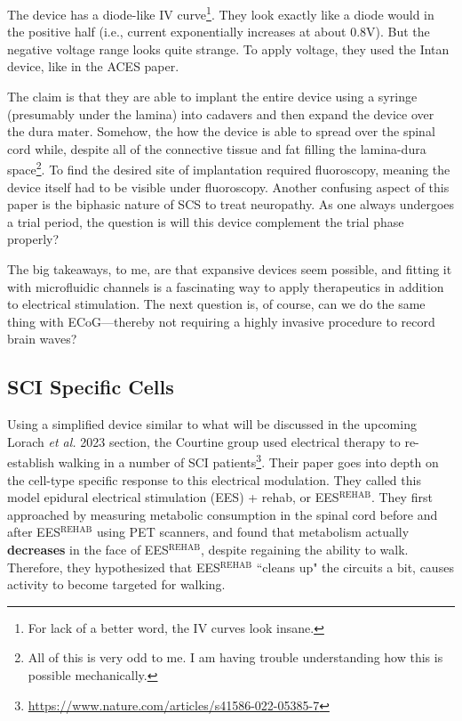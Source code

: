 The device has a diode-like IV curve\footnote{For lack of a better word, the IV curves look insane.}. They look exactly like a diode would in the positive half (i.e., current exponentially increases at about 0.8V). But the negative voltage range looks quite strange. To apply voltage, they used the Intan device, like in the ACES paper.\newline

The claim is that they are able to implant the entire device using a syringe (presumably under the lamina) into cadavers and then expand the device over the dura mater. Somehow, the how the device is able to spread over the spinal cord while, despite all of the connective tissue and fat filling the lamina-dura space\footnote{All of this is very odd to me. I am having trouble understanding how this is possible mechanically.}. To find the desired site of implantation required fluoroscopy, meaning the device itself had to be visible under fluoroscopy. Another confusing aspect of this paper is the biphasic nature of SCS to treat neuropathy. As one always undergoes a trial period, the question is will this device complement the trial phase properly?\newline

The big takeaways, to me, are that expansive devices seem possible, and fitting it with microfluidic channels is a fascinating way to apply therapeutics in addition to electrical stimulation. The next question is, of course, can we do the same thing with ECoG---thereby not requiring a highly invasive procedure to record brain waves? 

\subsection{SCI Specific Cells}

\label{sec:SCISpecificCells}

Using a simplified device similar to what will be discussed in the upcoming Lorach \textit{et al.} 2023 section, the Courtine group used electrical therapy to re-establish walking in a number of SCI patients\footnote{\url{https://www.nature.com/articles/s41586-022-05385-7}}. Their paper goes into depth on the cell-type specific response to this electrical modulation. They called this model epidural electrical stimulation (EES) + rehab, or EES$^{\mathrm{REHAB}}$. They first approached by measuring metabolic consumption in the spinal cord before and after EES$^{\mathrm{REHAB}}$ using PET scanners, and found that metabolism actually \textbf{decreases} in the face of EES$^{\mathrm{REHAB}}$, despite regaining the ability to walk. Therefore, they hypothesized that EES$^{\mathrm{REHAB}}$ ``cleans up" the circuits a bit, causes activity to become targeted for walking.\newline

